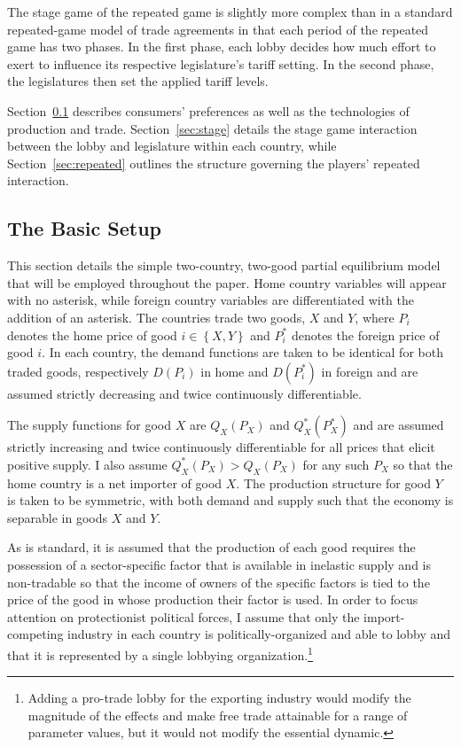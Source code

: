 \documentclass[authoryear, review]{elsarticle}
\begin{document}
The stage game of the repeated game is slightly more complex than in a standard repeated-game model of trade agreements in that each period of the repeated game has two phases. In the first phase, each lobby decides how much effort to exert to influence its respective legislature's tariff setting. In the second phase, the legislatures then set the applied tariff levels.

Section~\ref{sec:basic} describes consumers' preferences as well as the technologies of production and trade. Section~\ref{sec:stage} details the stage game interaction between the lobby and legislature within each country, while Section~\ref{sec:repeated} outlines the structure governing the players' repeated interaction.


\subsection{The Basic Setup}
\label{sec:basic}
This section details the simple two-country, two-good partial equilibrium model that will be employed throughout the paper. Home country variables will appear with no asterisk, while foreign country variables are differentiated with the addition of an asterisk. The countries trade two goods, $X$ and $Y$, where $P_i$ denotes the home price of good $i \in \left\{X,Y\right\}$ and $P_i^*$ denotes the foreign price of good $i$. In each country, the demand functions are taken to be identical for both traded goods, respectively $D(P_i)$ in home and $D(P_i^*)$ in foreign and are assumed strictly decreasing and twice continuously differentiable.

The supply functions for good $X$ are $Q_X(P_X)$ and $Q_X^*(P_X^*)$ and are assumed strictly increasing and twice continuously differentiable for all prices that elicit positive supply. I also assume $Q_X^*(P_X) > Q_X(P_X)$ for any such $P_X$ so that the home country is a net importer of good $X$. The production structure for good $Y$ is taken to be symmetric, with both demand and supply such that the economy is separable in goods $X$ and $Y$.

As is standard, it is assumed that the production of each good requires the possession of a sector-specific factor that is available in inelastic supply and is non-tradable so that the income of owners of the specific factors is tied to the price of the good in whose production their factor is used. In order to focus attention on protectionist political forces, I assume that only the import-competing industry in each country is politically-organized and able to lobby and that it is represented by a single lobbying organization.\footnote{Adding a pro-trade lobby for the exporting industry would modify the magnitude of the effects and make free trade attainable for a range of parameter values, but it would not modify the essential dynamic.}
\end{document}
